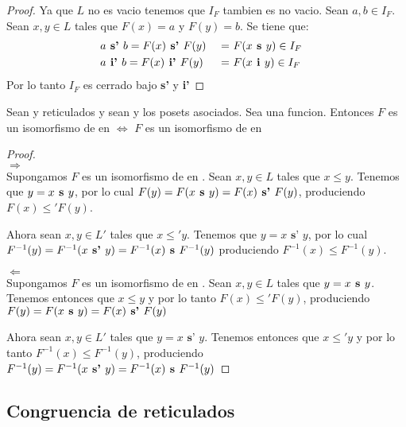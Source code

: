 \begin{proof}
  Ya que $L$ no es vacio tenemos que $I_F$ tambien es no vacio. Sean $a, b \in I_F$. Sean $x, y \in L$ tales que $F(x) = a$ y $F(y) = b$.
  Se tiene que:
  \begin{alignat*}{3}
    &a \textbf{ s' }b = F(x) \textbf{ s' } F(y) &\ =&\ F(\supbin{x}{y}) \in I_F&\\
    &a \textbf{ i' }b = F(x) \textbf{ i' } F(y) &\ =&\ F(\infbin{x}{y}) \in I_F&
  \end{alignat*}
  Por lo tanto $I_F$ es cerrado bajo \textbf{ s' } y \textbf{ i' }
\end{proof}
\begin{lemma}
  Sean \reticulAlg y  reticulados y sean  y 
  los posets asociados. Sea  una funcion. Entonces $F$ es un isomorfismo de
  \reticulAlg en  $\iff$ $F$ es un isomorfismo de  en 
\end{lemma}
\begin{proof}
  ${}$\\
  $\Rightarrow$\\
  Supongamos $F$ es un isomorfismo de \reticulAlg en . Sean $x, y \in L$ tales que $x \leq y$.
  Tenemos que $y = x\textbf{ s }y$, por lo cual $F(y) = F(x\textbf{ s }y) = F(x) \textbf{ s' }F(y)$, produciendo $F(x) \leq' F(y)$.
  
  Ahora sean $x, y \in L'$ tales que $x \leq' y$. Tenemos que $y = x \textbf{ s' } y$, por lo cual $F^{-1}(y) = F^{-1}(x \textbf{ s' }y) = F^{-1}(x)\textbf{ s }F^{-1}(y)$
  produciendo $F^{-1}(x) \leq F^{-1}(y)$.

  $\Leftarrow$\\
  Supongamos $F$ es un isomorfismo de  en . Sean $x, y \in L$ tales que $y = x\textbf{ s }y$. Tenemos entonces
  que $x \leq y$ y por lo tanto $F(x) \leq' F(y)$, produciendo $F(y) = F(x\textbf{ s }y) = F(x) \textbf{ s' }F(y)$

  Ahora sean $x, y \in L'$ tales que $y = x \textbf{ s' } y$. Tenemos entonces que $x\leq'y$ y por lo tanto $F^{-1}(x) \leq F^{-1}(y)$, produciendo
  $F^{-1}(y) = F^{-1}(x \textbf{ s' }y) = F^{-1}(x)\textbf{ s }F^{-1}(y)$

\end{proof}

\subsection{Congruencia de reticulados}

